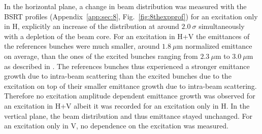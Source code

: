 \documentclass[%
 reprint,
 amsmath,amssymb,
 aps,
prstab,
]{revtex4-1}
\begin{document}
In the horizontal plane, a change in beam distribution was measured with the BSRT profiles (Appendix~\ref{app:sec:8}, Fig.~\ref{fig:8thexpprof}) for an excitation only in H, explicitly an increase of the distribution at around $2.0~\sigma$ simultaneously with a depletion of the beam core. For an excitation in H+V the emittances of the references bunches were much smaller, around $1.8~\mu$m normalized emittance on average, than the ones of the excited bunches ranging from $2.3~\mu$m to $3.0~\mu$m as described in \cite{resexmd2017}. The references bunches thus experienced a stronger emittance growth due to intra-beam scattering than the excited bunches due to the excitation on top of their smaller emittance growth due to intra-beam scattering. Therefore no excitation amplitude dependent emittance growth was observed for an excitation in H+V albeit it was recorded for an excitation only in H. In the vertical plane, the beam distribution and thus emittance stayed unchanged. For an excitation only in V, no dependence on the excitation was measured.
 
\end{document}
